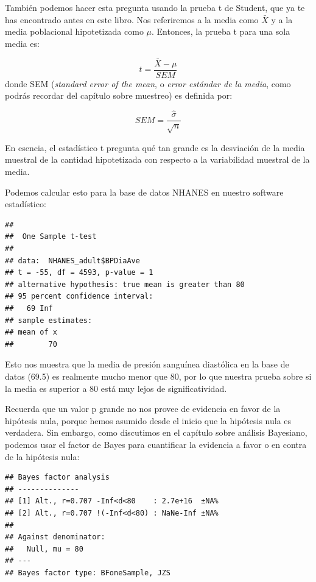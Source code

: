\documentclass[
  12pt,
]{book}
\newenvironment{Shaded}{\begin{snugshade}}{\end{snugshade}}
\newcommand{\AttributeTok}[1]{\textcolor[rgb]{0.77,0.63,0.00}{#1}}
\newcommand{\ConstantTok}[1]{\textcolor[rgb]{0.00,0.00,0.00}{#1}}
\newcommand{\DecValTok}[1]{\textcolor[rgb]{0.00,0.00,0.81}{#1}}
\newcommand{\FunctionTok}[1]{\textcolor[rgb]{0.00,0.00,0.00}{#1}}
\newcommand{\NormalTok}[1]{#1}
\newcommand{\SpecialCharTok}[1]{\textcolor[rgb]{0.00,0.00,0.00}{#1}}
\begin{document}
También podemos hacer esta pregunta usando la prueba t de Student, que ya te has encontrado antes en este libro. Nos referiremos a la media como \(\bar{X}\) y a la media poblacional hipotetizada como \(\mu\). Entonces, la prueba t para una sola media es:

\[
t = \frac{\bar{X} - \mu}{SEM}
\]
donde SEM (\emph{standard error of the mean}, o \emph{error estándar de la media}, como podrás recordar del capítulo sobre muestreo) es definida por:

\[
SEM = \frac{\hat{\sigma}}{\sqrt{n}}
\]

En esencia, el estadístico t pregunta qué tan grande es la desviación de la media muestral de la cantidad hipotetizada con respecto a la variabilidad muestral de la media.

Podemos calcular esto para la base de datos NHANES en nuestro software estadístico:

\begin{verbatim}
## 
##  One Sample t-test
## 
## data:  NHANES_adult$BPDiaAve
## t = -55, df = 4593, p-value = 1
## alternative hypothesis: true mean is greater than 80
## 95 percent confidence interval:
##   69 Inf
## sample estimates:
## mean of x 
##        70
\end{verbatim}

Esto nos muestra que la media de presión sanguínea diastólica en la base de datos (69.5) es realmente mucho menor que 80, por lo que nuestra prueba sobre si la media es superior a 80 está muy lejos de significatividad.

Recuerda que un valor p grande no nos provee de evidencia en favor de la hipótesis nula, porque hemos asumido desde el inicio que la hipótesis nula es verdadera. Sin embargo, como discutimos en el capítulo sobre análisis Bayesiano, podemos usar el factor de Bayes para cuantificar la evidencia a favor o en contra de la hipótesis nula:

\begin{Shaded}
\end{Shaded}

\begin{verbatim}
## Bayes factor analysis
## --------------
## [1] Alt., r=0.707 -Inf<d<80    : 2.7e+16  ±NA%
## [2] Alt., r=0.707 !(-Inf<d<80) : NaNe-Inf ±NA%
## 
## Against denominator:
##   Null, mu = 80 
## ---
## Bayes factor type: BFoneSample, JZS
\end{verbatim}
\end{document}
